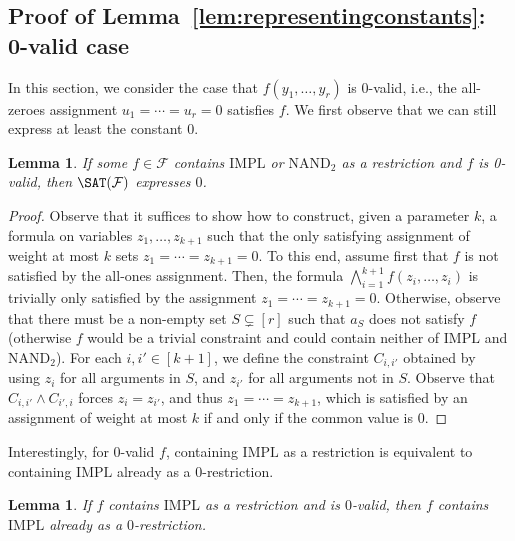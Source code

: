\documentclass[10pt,a4paper]{article}
\theoremstyle{plain}
\newtheorem{lem}[thm]{Lemma}
\newcommand{\NAND}{\mathrm{NAND}}
\newcommand{\Impl}{\mathrm{IMPL}}
\newcommand{\confam}{\mathcal{F}}
\begin{document}
\subsection{Proof of Lemma~\ref{lem:representingconstants}: 0-valid case}
\label{sec:0valid}
%
In this section, we consider the case that $f(y_1,\dots,y_r)$ is $0$-valid, i.e., the all-zeroes assignment $u_1=\cdots = u_r= 0$ satisfies $f$. We first observe that we can still express at least the constant 0.
%
\begin{lem}\label{lem:0validexpresses0}
If some $f\in \confam$ contains $\Impl$ or $\NAND_2$ as a restriction and $f$ is 0-valid, then $\SAT(\confam)$ expresses $0$.
\end{lem}
\begin{proof}
Observe that it suffices to show how to construct, given a parameter $k$, a formula on variables $z_1,\dots, z_{k+1}$ such that the only satisfying assignment of weight at most $k$ sets $z_1=\cdots = z_{k+1}=0$.
%
To this end, assume first that $f$ is not satisfied by the all-ones assignment. Then, the formula $\bigwedge_{i=1}^{k+1} f(z_i,\dots,z_i)$ is trivially only satisfied by the assignment $z_1=\cdots = z_{k+1} = 0$.
%
Otherwise, observe that there must be a non-empty set $S\subsetneq [r]$ such that $a_S$ does not satisfy $f$ (otherwise $f$ would be a trivial constraint and could contain neither of $\Impl$ and $\NAND_2$). For each $i,i'\in [k+1]$, we define the constraint $C_{i,i'}$ obtained by using $z_i$ for all arguments in $S$, and $z_{i'}$ for all arguments not in $S$. Observe that $C_{i,i'} \wedge C_{i',i}$ forces $z_i = z_{i'}$, and thus $z_1= \cdots = z_{k+1}$, which is satisfied by an assignment of weight at most $k$ if and only if the common value is $0$. 
\end{proof}
%
Interestingly, for $0$-valid $f$, containing $\Impl$ as a restriction is equivalent to containing $\Impl$ already as a $0$-restriction.
%
\begin{lem}\label{lem:Implas0restr}
If $f$ contains $\Impl$ as a restriction and is $0$-valid, then $f$ contains $\Impl$ already as a $0$-restriction.
\end{lem}
\end{document}
